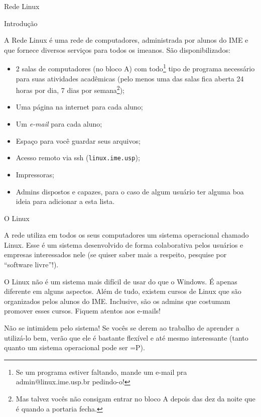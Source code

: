 \begin{subsecao}{Rede Linux}


\begin{subsubsecao}{Introdução}

A Rede Linux é uma rede de computadores, administrada por alunos do IME e
que fornece diversos serviços para todos os imeanos.
São disponibilizados:

\vspace{-1em}

\begin{itemize}
\item 2 salas de computadores (no bloco A) com todo\footnote{ Se um programa
estiver faltando, mande um e-mail pra admin@linux.ime.usp.br pedindo-o!} tipo de
programa necessário para suas atividades acadêmicas (pelo menos uma das salas fica
aberta 24 horas por dia, 7 dias por semana\footnote{ Mas talvez vocês não
consigam entrar no bloco A depois das dez da noite que é quando a portaria
fecha.});
\item Uma página na internet para cada aluno;
\item Um \textit{e-mail} para cada aluno;
\item Espaço para você guardar seus arquivos;
\item Acesso remoto via ssh (\texttt{linux.ime.usp});
\item Impressoras;
\item Admins dispostos e capazes, para o caso de algum usuário ter alguma boa
ideia para adicionar a esta lista.
\end{itemize}
\end{subsubsecao}

\begin{subsubsecao}{O Linux}

A rede utiliza em todos os seus computadores um sistema operacional chamado
Linux. Esse é um sistema desenvolvido de forma colaborativa pelos usuários
e empresas interessados nele (se quiser saber mais a respeito, pesquise
por ``software livre''!).

O Linux não é um sistema mais difícil de usar do que o Windows. É apenas
diferente em alguns aspectos. Além de tudo, existem cursos de Linux que são
organizados pelos alunos do IME. Inclusive, são os admins que costumam promover 
esses cursos. Fiquem atentos aos e-mails!

Não se intimidem pelo sistema! Se vocês se derem ao trabalho de
aprender a utilizá-lo bem, verão que ele é bastante flexível e até mesmo
interessante (tanto quanto um sistema operacional pode ser =P).


\end{subsubsecao}
\end{subsecao}
